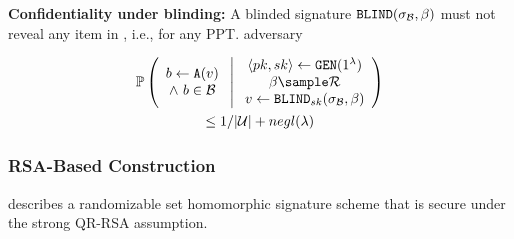 \item \textbf{Confidentiality under blinding:} A blinded signature $\blind(\genericSig[\blocklist], \blindingFactor)$ must not reveal any item in \blocklist, i.e., for any PPT. adversary 


\begin{gather*}
\cprob{bigg}{\begin{array}{c} \genericBlocklistElmt \assign \adversary(\genericSigPair[1])  \\ \land ~\genericBlocklistElmt \in \blocklist\end{array} }{\begin{array}{c} \langle \pubKey, \privKey \rangle \assign \keyGen(1^{\secParam}) \\ \blindingFactor \sample \genericRandSpace \\ \genericSigPair[1] \assign \blind[\privKey](\genericSig[\blocklist], \blindingFactor)\end{array} } \\ \le 1/|\universe| + \neglProb 
\end{gather*}

\itemListEnd



\subsubsection{RSA-Based Construction}

 describes a  randomizable set homomorphic signature scheme that is secure under the strong QR-RSA assumption. 

